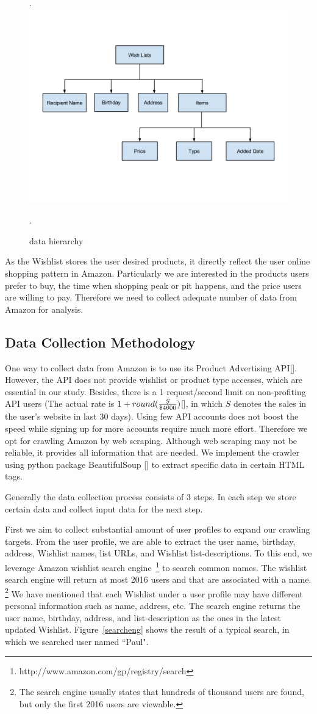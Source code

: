 \begin{figure}[h!].
\centering
\includegraphics[width=.45\textwidth]{data_struct.png}
\caption{data hierarchy}.
\label{data_struct}
\end{figure}

As the Wishlist stores the user desired products, it directly reflect the user online shopping pattern in Amazon. Particularly we are interested in the products users prefer to buy, the time when shopping peak or pit happens, and the price users are willing to pay. Therefore we need to collect adequate number of data from Amazon for analysis. 

\subsection{Data Collection Methodology}
One way to collect data from Amazon is to use its Product Advertising API[]. However, the API does not provide wishlist or product type accesses, which are essential in our study. Besides, there is a 1 request/second limit on non-profiting API users (The actual rate is $1 + round({S\over \$4600})$[], in which $S$ denotes the sales in the user's website in last 30 days). Using few API accounts does not boost the speed while signing up for more accounts require much more effort. Therefore we opt for crawling Amazon by web scraping. Although web scraping may not be reliable, it provides all information that are needed. We implement the crawler using python package BeautifulSoup [] to extract specific data in certain HTML tags. 

Generally the data collection process consists of 3 steps. In each step we store certain data and collect input data for the next step. 

First we aim to collect substantial amount of user profiles to expand our crawling targets. From the user profile, we are able to extract the user name, birthday, address, Wishlist names, list URLs, and Wishlist list-descriptions. To this end, we leverage Amazon wishlist search engine~\footnote{http://www.amazon.com/gp/registry/search} to search common names. The wishlist search engine will return at most 2016 users and that are associated with a name. \footnote {The search engine usually states that hundreds of thousand users are found, but only the first 2016 users are viewable.} We have mentioned that each Wishlist under a user profile may have different personal information such as name, address, etc. The search engine returns the user name, birthday, address, and list-description as the ones in the latest updated Wishlist. Figure~\ref{searcheng} shows the result of a typical search, in which we searched user named ``Paul".



